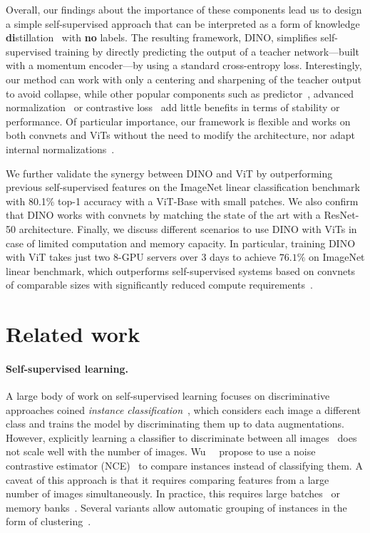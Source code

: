 Overall, our findings about the importance of these components lead us to design a simple self-supervised approach that can be interpreted as a form of knowledge \textbf{di}stillation~\cite{hinton2015distilling} with \textbf{no} labels. The resulting framework, DINO, simplifies self-supervised training by directly predicting the output of a teacher network---built with a momentum encoder---by using a standard cross-entropy loss. Interestingly, our method can work with only a centering and sharpening of the teacher output to avoid collapse, while other popular components such as predictor~\cite{grill2020bootstrap}, advanced normalization~\cite{caron2020unsupervised} or contrastive loss~\cite{he2020momentum} add little benefits in terms of stability or performance. Of particular importance, our framework is flexible and works on both convnets and ViTs without the need to modify the architecture, nor adapt internal normalizations~\cite{richemond2020byol}. 

We further validate the synergy between DINO and ViT by outperforming previous self-supervised features on the ImageNet linear classification benchmark with 80.1\% top-1 accuracy with a ViT-Base with small patches. We also confirm that DINO works with convnets by matching the state of the art with a ResNet-50 architecture. Finally, we discuss different scenarios to use DINO with ViTs in case of limited computation and memory capacity. In particular, training DINO with ViT takes just two 8-GPU servers over 3 days to achieve $76.1\%$ on ImageNet linear benchmark, which outperforms self-supervised systems based on convnets of comparable sizes with significantly reduced compute requirements~\cite{caron2020unsupervised,grill2020bootstrap}.

\section{Related work}

\paragraph{Self-supervised learning.} A large body of work on self-supervised learning focuses on discriminative approaches coined \emph{instance classification}~\cite{chen2020simple,dosovitskiy2016discriminative,he2020momentum,wu2018unsupervised}, which considers each image a different class and trains the model by discriminating them up to data augmentations. However, explicitly learning a classifier to discriminate between all images~\cite{dosovitskiy2016discriminative} does not scale well with the number of images. 
Wu~\etal~\cite{wu2018unsupervised} propose to use a noise contrastive estimator (NCE)~\cite{gutmann2010noise} to compare instances instead of classifying them. A caveat of this approach is that it requires comparing features from a large number of images simultaneously. In practice, this requires large batches~\cite{chen2020simple} or memory banks~\cite{he2020momentum, wu2018unsupervised}. Several variants allow automatic grouping of instances in the form of clustering~\cite{asano2019self,caron2018deep,caron2019unsupervised,huang2019unsupervised,junnan2021prototypical,xie2016unsupervised,yang2016joint,zhuang2019local}.

